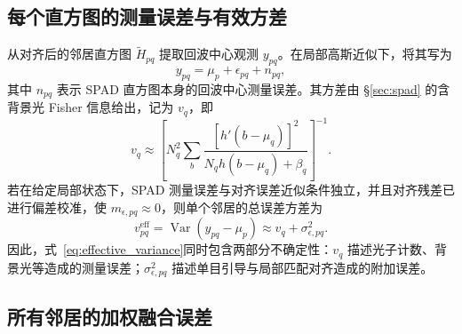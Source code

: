 \documentclass[11pt,a4paper]{ctexart}
\numberwithin{equation}{section}
\newcommand{\Var}{\operatorname{Var}}
\begin{document}
\subsection{每个直方图的测量误差与有效方差}

从对齐后的邻居直方图 $\widetilde H_{pq}$ 提取回波中心观测 $y_{pq}$。在局部高斯近似下，将其写为
\begin{equation}
    y_{pq}
    =
    \mu_p+\epsilon_{pq}+n_{pq},
    \label{eq:neighbor_error_model}
\end{equation}
其中 $n_{pq}$ 表示 SPAD 直方图本身的回波中心测量误差。其方差由 \S\ref{sec:spad} 的含背景光 Fisher 信息给出，记为 $v_q$，即
\begin{equation}
    \boxed{
    v_q
    \approx
    \left[
    N_q^2
    \sum_b
    \frac{[h'(b-\mu_q)]^2}
    {N_qh(b-\mu_q)+\beta_q}
    \right]^{-1}
    }.
    \label{eq:vq_background}
\end{equation}
若在给定局部状态下，SPAD 测量误差与对齐误差近似条件独立，并且对齐残差已进行偏差校准，使 $m_{\epsilon,pq}\approx0$，则单个邻居的总误差方差为
\begin{equation}
    \boxed{
    v_{pq}^{\mathrm{eff}}
    =
    \Var(y_{pq}-\mu_p)
    \approx
    v_q+\sigma_{\epsilon,pq}^{2}
    }.
    \label{eq:effective_variance}
\end{equation}
因此，式~\eqref{eq:effective_variance}同时包含两部分不确定性：$v_q$ 描述光子计数、背景光等造成的测量误差；$\sigma_{\epsilon,pq}^{2}$ 描述单目引导与局部匹配对齐造成的附加误差。

\subsection{所有邻居的加权融合误差}
\end{document}
